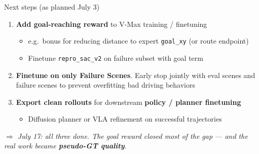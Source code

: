 \begin{frame}{Next steps (as planned July 3)}
  \begin{enumerate}
    \item \textbf{Add goal-reaching reward} to V-Max training / finetuning
    \begin{itemize}
      \item e.g.\ bonus for reducing distance to expert \texttt{goal\_xy} (or route endpoint)
      \item Finetune \texttt{repro\_sac\_v2} on failure subset with goal term
    \end{itemize}
    \item \textbf{Finetune on only Failure Scenes}. Early stop jointly with eval scenes and failure scenes to prevent overfitting bad driving behaviors
    \item \textbf{Export clean rollouts} for downstream \textbf{policy / planner finetuning}
    \begin{itemize}
      \item Diffusion planner or VLA refinement on successful trajectories
    \end{itemize}
  \end{enumerate}

  \vspace{0.6em}
  \centering
  \textit{$\Rightarrow$ July 17: all three done. The goal reward closed most of the gap ---
  and the real work became \textbf{pseudo-GT quality}.}
\end{frame}
